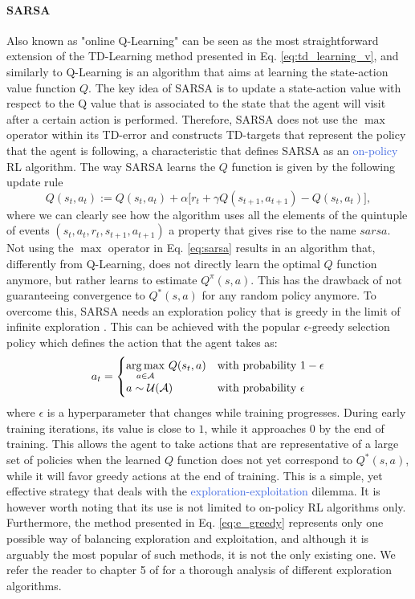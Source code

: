 \paragraph{\textbf{\uppercase{SARSA}}} Also known as "online Q-Learning" \cite{rummery1994line} can be seen as the most straightforward extension of the TD-Learning method presented in Eq. \ref{eq:td_learning_v}, and similarly to Q-Learning is an algorithm that aims at learning the state-action value function $Q$. The key idea of SARSA is to update a state-action value with respect to the Q value that is associated to the state that the agent will visit after a certain action is performed. Therefore, SARSA does not use the $\max$ operator within its TD-error and constructs TD-targets that represent the policy that the agent is following, a characteristic that defines SARSA as an \textcolor{RoyalBlue}{on-policy} RL algorithm. The way SARSA learns the $Q$ function is given by the following update rule
\begin{equation}
	Q(s_t,a_t):=Q(s_t,a_t) + \alpha\big[r_t + \gamma Q(s_{t+1},a_{t+1}) - Q(s_t, a_t) \big], 
	\label{eq:sarsa}
\end{equation}
where we can clearly see how the algorithm uses all the elements of the quintuple of events $(s_t, a_t, r_t, s_{t+1}, a_{t+1})$ a property that gives rise to the name $sarsa$. Not using the $\max$ operator in Eq. \ref{eq:sarsa} results in an algorithm that, differently from Q-Learning, does not directly learn the optimal $Q$ function anymore, but rather learns to estimate $Q^{\pi}(s,a)$. This has the drawback of not guaranteeing convergence to $Q^{*}(s,a)$ for any random policy anymore. To overcome this, SARSA needs an exploration policy that is greedy in the limit of infinite exploration \cite{singh2000convergence}. This can be achieved with the popular $\epsilon$-$\text{greedy}$ selection policy which defines the action that the agent takes as:
\begin{equation}
a_t = \begin{cases}
\underset{a\in\mathcal{A}}{\operatorname*{arg\,max}} \ Q(s_t,a) &\text{with probability $1-\epsilon$}\\
a \sim \mathcal{U}(\mathcal{A}) &\text{with probability $\epsilon$}
\end{cases}
\label{eq:e_greedy}
\end{equation}
where $\epsilon$ is a hyperparameter that changes while training progresses. During early training iterations, its value is close to $1$, while it approaches $0$ by the end of training. This allows the agent to take actions that are representative of a large set of policies when the learned $Q$ function does not yet correspond to $Q^{*}(s,a)$, while it will favor greedy actions at the end of training. This is a simple, yet effective strategy that deals with the \textcolor{RoyalBlue}{exploration-exploitation} dilemma. It is however worth noting that its use is not limited to on-policy RL algorithms only. Furthermore, the method presented in Eq. \ref{eq:e_greedy} represents only one possible way of balancing exploration and exploitation, and although it is arguably the most popular of such methods, it is not the only existing one. We refer the reader to chapter 5 of \cite{wiering1999explorations} for a thorough analysis of different exploration algorithms.

